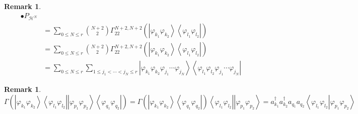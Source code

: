 \documentclass[aps,preprint]{revtex4}%
\newtheorem{remark}[theorem]{Remark}
\begin{document}
\begin{remark}
\begin{align}
\bullet P_{\mathcal{H}^{N}}\\
&  =\sum_{0\leq N\leq r}\binom{N+2}{2}\Gamma_{22}^{N+2,N+2}\left(  \left\vert
\varphi_{k_{1}}\varphi_{k_{2}}\right\rangle \left\langle \varphi_{l_{1}%
}\varphi_{l_{2}}\right\vert \right) \\
&  =\sum_{0\leq N\leq r}\binom{N+2}{2}\Gamma_{22}^{N+2,N+2}\left(  \left\vert
\varphi_{k_{1}}\varphi_{k_{2}}\right\rangle \left\langle \varphi_{l_{1}%
}\varphi_{l_{2}}\right\vert \right) \\
&  =\sum_{0\leq N\leq r}\sum_{1\leq j_{1}<\cdots<j_{N}\leq r}\left\vert
\varphi_{k_{1}}\varphi_{k_{2}}\varphi_{j_{1}}\cdots\varphi_{j_{N}%
}\right\rangle \left\langle \varphi_{l_{1}}\varphi_{l_{2}}\varphi_{j_{1}%
}\cdots\varphi_{j_{N}}\right\vert
\end{align}

\end{remark}

\begin{remark}%
\begin{equation}
\Gamma\left(  \left\vert \varphi_{k_{1}}\varphi_{k_{2}}\right\rangle
\left\langle \varphi_{l_{1}}\varphi_{l_{2}}\right\vert \left\vert
\varphi_{p_{1}}\varphi_{p_{2}}\right\rangle \left\langle \varphi_{q_{1}%
}\varphi_{q_{2}}\right\vert \right)  =\Gamma\left(  \left\vert \varphi_{k_{1}%
}\varphi_{k_{2}}\right\rangle \left\langle \varphi_{q_{1}}\varphi_{q_{2}%
}\right\vert \right)  \left\langle \varphi_{l_{1}}\varphi_{l_{2}}\right\vert
\left\vert \varphi_{p_{1}}\varphi_{p_{2}}\right\rangle =a_{k_{1}}^{\dagger
}a_{k_{2}}^{\dagger}a_{q_{1}}a_{q_{2}}\left\langle \left.  \varphi_{l_{1}%
}\varphi_{l_{2}}\right\vert \varphi_{p_{1}}\varphi_{p_{2}}\right\rangle
\end{equation}

\end{remark}

%
\end{document}
